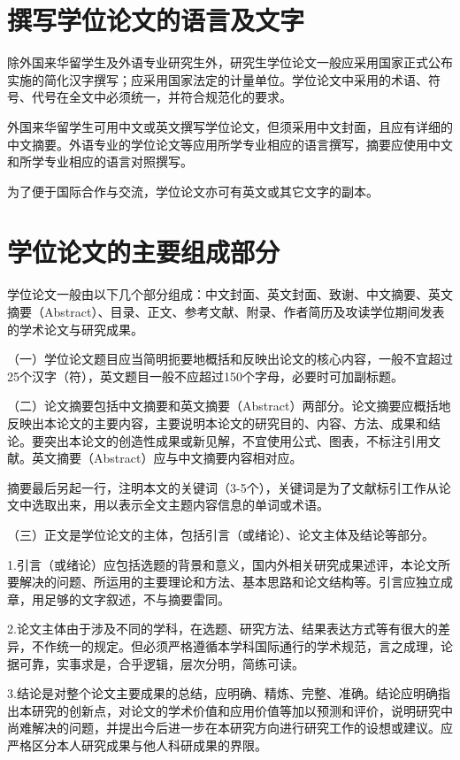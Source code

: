 \documentclass[a4paper,12pt,oneside,openany]{book}
\begin{document}
\begin{CJK}{UTF8}{hei}
\section{撰写学位论文的语言及文字}

除外国来华留学生及外语专业研究生外，研究生学位论文一般应采用国家正式公布实施的简化汉字撰写；应采用国家法定的计量单位。学位论文中采用的术语、符号、代号在全文中必须统一，并符合规范化的要求。

外国来华留学生可用中文或英文撰写学位论文，但须采用中文封面，且应有详细的中文摘要。外语专业的学位论文等应用所学专业相应的语言撰写，摘要应使用中文和所学专业相应的语言对照撰写。

为了便于国际合作与交流，学位论文亦可有英文或其它文字的副本。


\section{学位论文的主要组成部分}

学位论文一般由以下几个部分组成：中文封面、英文封面、致谢、中文摘要、英文摘要（Abstract）、目录、正文、参考文献、附录、作者简历及攻读学位期间发表的学术论文与研究成果。

（一）学位论文题目应当简明扼要地概括和反映出论文的核心内容，一般不宜超过25个汉字（符），英文题目一般不应超过150个字母，必要时可加副标题。

（二）论文摘要包括中文摘要和英文摘要（Abstract）两部分。论文摘要应概括地反映出本论文的主要内容，主要说明本论文的研究目的、内容、方法、成果和结论。要突出本论文的创造性成果或新见解，不宜使用公式、图表，不标注引用文献。英文摘要（Abstract）应与中文摘要内容相对应。

摘要最后另起一行，注明本文的关键词（3-5个），关键词是为了文献标引工作从论文中选取出来，用以表示全文主题内容信息的单词或术语。

（三）正文是学位论文的主体，包括引言（或绪论）、论文主体及结论等部分。

1.引言（或绪论）应包括选题的背景和意义，国内外相关研究成果述评，本论文所要解决的问题、所运用的主要理论和方法、基本思路和论文结构等。引言应独立成章，用足够的文字叙述，不与摘要雷同。

2.论文主体由于涉及不同的学科，在选题、研究方法、结果表达方式等有很大的差异，不作统一的规定。但必须严格遵循本学科国际通行的学术规范，言之成理，论据可靠，实事求是，合乎逻辑，层次分明，简练可读。

3.结论是对整个论文主要成果的总结，应明确、精炼、完整、准确。结论应明确指出本研究的创新点，对论文的学术价值和应用价值等加以预测和评价，说明研究中尚难解决的问题，并提出今后进一步在本研究方向进行研究工作的设想或建议。应严格区分本人研究成果与他人科研成果的界限。


\end{CJK}
\end{document}
